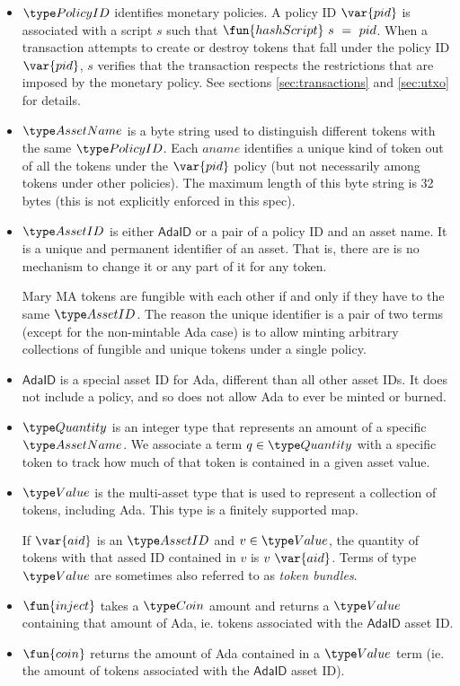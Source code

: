 \begin{itemize}
  \item $\PolicyID$ identifies monetary policies. A policy ID $\var{pid}$ is associated with a script
    $s$ such that $\fun{hashScript}~s~=~pid$. When a transaction attempts to create or destroy tokens
    that fall under the policy ID $\var{pid}$,
    $s$ verifies that the transaction
    respects the restrictions that are imposed by the monetary policy.
    See sections \ref{sec:transactions} and \ref{sec:utxo} for details.

  \item $\AssetName$ is a byte string used to distinguish different tokens with the same $\PolicyID$.
    Each $aname$ identifies a unique kind of token out of all the tokens under the
    $\var{pid}$ policy (but not necessarily among tokens under other policies).
    The maximum length of this
    byte string is 32 bytes (this is not explicitly enforced in this spec).

  \item $\AssetID$ is either $\mathsf{AdaID}$ or a pair of a policy ID and an asset name.
  It is a unique and permanent
  identifier of an asset. That is, there are is no mechanism to change it or
  any part of it for any token.

  Mary MA tokens are fungible with each other if and only if they have to the same $\AssetID$.
  The reason the unique identifier is a pair of two terms (except for the non-mintable Ada case) is to allow
  minting arbitrary collections of fungible and unique tokens under a single policy.

  \item $\mathsf{AdaID}$ is a special asset ID for Ada, different than all other asset IDs.
  It does not include a policy, and so does not allow Ada to ever be minted or burned.

  \item $\Quantity$ is an integer type that represents an amount of a specific $\AssetName$. We associate
    a term $q\in\Quantity$ with a specific token to track how much of that token is contained in a given asset value.

  \item $\Value$ is the multi-asset type that is used to represent
    a collection of tokens, including Ada. This type is a finitely supported map.

    If $\var{aid}$ is an $\AssetID$ and $v \in \Value$,
    the quantity of tokens with that assed ID contained in $v$ is $v~\var{aid}$.
    Terms of type $\Value$ are sometimes also referred to as
    \emph{token bundles}.

  \item $\fun{inject}$ takes a $\Coin$ amount and returns a $\Value$ containing
  that amount of Ada, ie. tokens associated with the $\mathsf{AdaID}$ asset ID.

  \item $\fun{coin}$ returns the amount of Ada contained in a $\Value$ term (ie.
  the amount of tokens associated with the $\mathsf{AdaID}$ asset ID).
\end{itemize}

